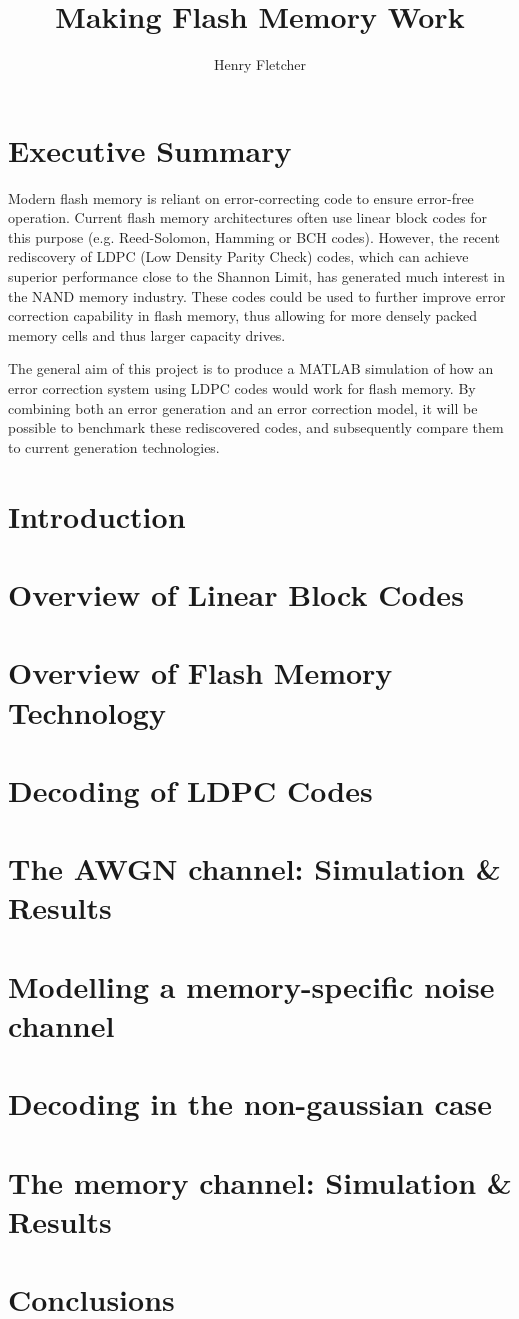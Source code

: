 \documentclass[11pt]{article}
\author{Henry Fletcher}
\title{Making Flash Memory Work}
\begin{document}
\section{Executive Summary}

Modern flash memory is reliant on error-correcting code to ensure error-free operation. Current flash memory architectures often use linear block codes for this purpose (e.g. Reed-Solomon, Hamming or BCH codes). However, the recent rediscovery of LDPC (Low Density Parity Check) codes, which can achieve superior performance close to the Shannon Limit, has generated much interest in the NAND memory industry. These codes could be used to further improve error correction capability in flash memory, thus allowing for more densely packed memory cells and thus larger capacity drives.

The general aim of this project is to produce a MATLAB simulation of how an error correction system using LDPC codes would work for flash memory.  By combining both an error generation and an error correction model, it will be possible to benchmark these rediscovered codes, and subsequently compare them to current generation technologies.

\tableofcontents

\section{Introduction}

\section{Overview of Linear Block Codes}

\section{Overview of Flash Memory Technology} 

\section{Decoding of LDPC Codes}

\section{The AWGN channel: Simulation \& Results}

\section{Modelling a memory-specific noise channel}

\section{Decoding in the non-gaussian case}

\section{The memory channel: Simulation \& Results}

\section{Conclusions}
\end{document}

